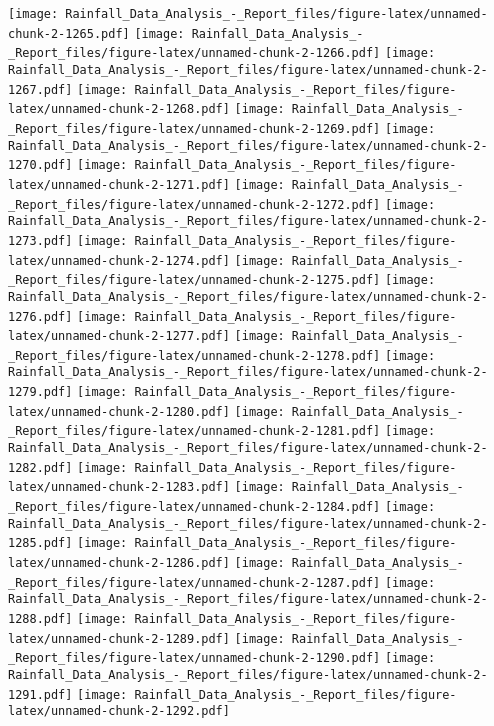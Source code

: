 \documentclass[
]{article}
\begin{document}
\texttt{[image: Rainfall\_Data\_Analysis\_-\_Report\_files/figure-latex/unnamed-chunk-2-1265.pdf]}
\texttt{[image: Rainfall\_Data\_Analysis\_-\_Report\_files/figure-latex/unnamed-chunk-2-1266.pdf]}
\texttt{[image: Rainfall\_Data\_Analysis\_-\_Report\_files/figure-latex/unnamed-chunk-2-1267.pdf]}
\texttt{[image: Rainfall\_Data\_Analysis\_-\_Report\_files/figure-latex/unnamed-chunk-2-1268.pdf]}
\texttt{[image: Rainfall\_Data\_Analysis\_-\_Report\_files/figure-latex/unnamed-chunk-2-1269.pdf]}
\texttt{[image: Rainfall\_Data\_Analysis\_-\_Report\_files/figure-latex/unnamed-chunk-2-1270.pdf]}
\texttt{[image: Rainfall\_Data\_Analysis\_-\_Report\_files/figure-latex/unnamed-chunk-2-1271.pdf]}
\texttt{[image: Rainfall\_Data\_Analysis\_-\_Report\_files/figure-latex/unnamed-chunk-2-1272.pdf]}
\texttt{[image: Rainfall\_Data\_Analysis\_-\_Report\_files/figure-latex/unnamed-chunk-2-1273.pdf]}
\texttt{[image: Rainfall\_Data\_Analysis\_-\_Report\_files/figure-latex/unnamed-chunk-2-1274.pdf]}
\texttt{[image: Rainfall\_Data\_Analysis\_-\_Report\_files/figure-latex/unnamed-chunk-2-1275.pdf]}
\texttt{[image: Rainfall\_Data\_Analysis\_-\_Report\_files/figure-latex/unnamed-chunk-2-1276.pdf]}
\texttt{[image: Rainfall\_Data\_Analysis\_-\_Report\_files/figure-latex/unnamed-chunk-2-1277.pdf]}
\texttt{[image: Rainfall\_Data\_Analysis\_-\_Report\_files/figure-latex/unnamed-chunk-2-1278.pdf]}
\texttt{[image: Rainfall\_Data\_Analysis\_-\_Report\_files/figure-latex/unnamed-chunk-2-1279.pdf]}
\texttt{[image: Rainfall\_Data\_Analysis\_-\_Report\_files/figure-latex/unnamed-chunk-2-1280.pdf]}
\texttt{[image: Rainfall\_Data\_Analysis\_-\_Report\_files/figure-latex/unnamed-chunk-2-1281.pdf]}
\texttt{[image: Rainfall\_Data\_Analysis\_-\_Report\_files/figure-latex/unnamed-chunk-2-1282.pdf]}
\texttt{[image: Rainfall\_Data\_Analysis\_-\_Report\_files/figure-latex/unnamed-chunk-2-1283.pdf]}
\texttt{[image: Rainfall\_Data\_Analysis\_-\_Report\_files/figure-latex/unnamed-chunk-2-1284.pdf]}
\texttt{[image: Rainfall\_Data\_Analysis\_-\_Report\_files/figure-latex/unnamed-chunk-2-1285.pdf]}
\texttt{[image: Rainfall\_Data\_Analysis\_-\_Report\_files/figure-latex/unnamed-chunk-2-1286.pdf]}
\texttt{[image: Rainfall\_Data\_Analysis\_-\_Report\_files/figure-latex/unnamed-chunk-2-1287.pdf]}
\texttt{[image: Rainfall\_Data\_Analysis\_-\_Report\_files/figure-latex/unnamed-chunk-2-1288.pdf]}
\texttt{[image: Rainfall\_Data\_Analysis\_-\_Report\_files/figure-latex/unnamed-chunk-2-1289.pdf]}
\texttt{[image: Rainfall\_Data\_Analysis\_-\_Report\_files/figure-latex/unnamed-chunk-2-1290.pdf]}
\texttt{[image: Rainfall\_Data\_Analysis\_-\_Report\_files/figure-latex/unnamed-chunk-2-1291.pdf]}
\texttt{[image: Rainfall\_Data\_Analysis\_-\_Report\_files/figure-latex/unnamed-chunk-2-1292.pdf]}
\end{document}
